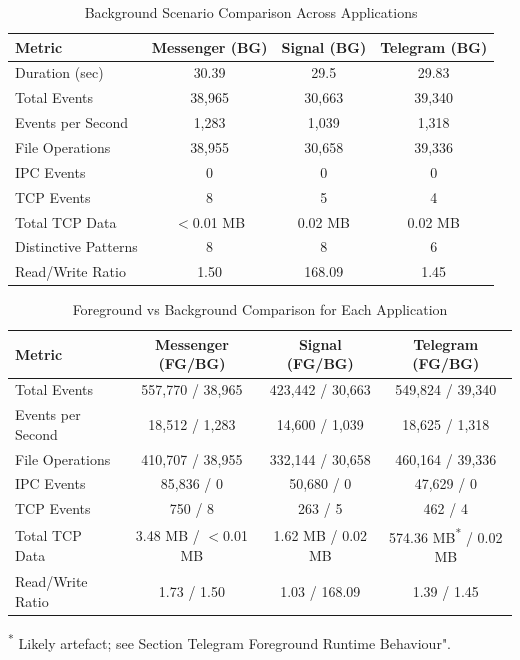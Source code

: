 \documentclass[a4paper,12pt]{report}
\begin{document}
\begin{table}[H]
    \centering
    \caption{Background Scenario Comparison Across Applications}
    \label{tab:comparison_bg_only}
    \begin{tabular}{|l|c|c|c|}
        \hline
        \textbf{Metric} & \textbf{Messenger (BG)} & \textbf{Signal (BG)} & \textbf{Telegram (BG)} \\
        \hline
        Duration (sec) & 30.39 & 29.5 & 29.83 \\
        Total Events & 38,965 & 30,663 & 39,340 \\
        Events per Second & 1,283 & 1,039 & 1,318 \\
        File Operations & 38,955 & 30,658 & 39,336 \\
        IPC Events & 0 & 0 & 0 \\
        TCP Events & 8 & 5 & 4 \\
        Total TCP Data & $<$0.01 MB & 0.02 MB & 0.02 MB \\
        Distinctive Patterns & 8 & 8 & 6 \\
        Read/Write Ratio & 1.50 & 168.09 & 1.45 \\
        \hline
    \end{tabular}
\end{table}

\begin{table}[H]
    \centering
    \footnotesize
    \caption{Foreground vs Background Comparison for Each Application}
    \label{tab:comparison_fg_vs_bg}
    \begin{tabular}{|l|c|c|c|}
        \hline
        \textbf{Metric} & \textbf{Messenger (FG/BG)} & \textbf{Signal (FG/BG)} & \textbf{Telegram (FG/BG)} \\
        \hline
        Total Events & 557,770 / 38,965 & 423,442 / 30,663 & 549,824 / 39,340 \\
        Events per Second & 18,512 / 1,283 & 14,600 / 1,039 & 18,625 / 1,318 \\
        File Operations & 410,707 / 38,955 & 332,144 / 30,658 & 460,164 / 39,336 \\
        IPC Events & 85,836 / 0 & 50,680 / 0 & 47,629 / 0 \\
        TCP Events & 750 / 8 & 263 / 5 & 462 / 4 \\
        Total TCP Data & 3.48 MB / $<$0.01 MB & 1.62 MB / 0.02 MB & 574.36 MB\textsuperscript{*} / 0.02 MB \\
        Read/Write Ratio & 1.73 / 1.50 & 1.03 / 168.09 & 1.39 / 1.45 \\
        \hline
    \end{tabular}
    \begin{flushleft}
    \footnotesize\textsuperscript{*} Likely artefact; see Section Telegram Foreground Runtime Behaviour".
    \end{flushleft}
\end{table}
\end{document}
